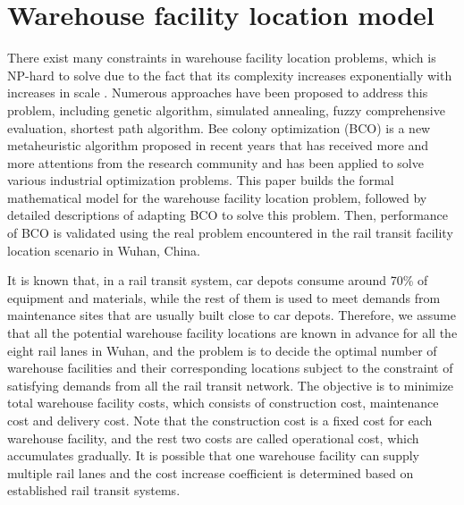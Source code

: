 \section{Warehouse facility location model}
There exist many constraints in warehouse facility location problems\citep{c1, c2}, which is NP-hard to solve due to the fact that its complexity increases exponentially with increases in scale \citep{c3}.
Numerous approaches have been proposed to address this problem, including genetic algorithm, simulated annealing, fuzzy comprehensive evaluation, shortest path algorithm.
Bee colony optimization (BCO) \citep{c4} is a new metaheuristic algorithm proposed in recent years that has received more and more attentions from the research community and has been applied to solve various industrial optimization problems.
This paper builds the formal mathematical model for the warehouse facility location problem, followed by detailed descriptions of adapting BCO to solve this problem.
Then, performance of BCO is validated using the real problem encountered in the rail transit facility location scenario in Wuhan, China.

It is known that, in a rail transit system, car depots consume around 70\% of equipment and materials, while the rest of them is used to meet demands from maintenance sites that are usually built close to car depots.
Therefore, we assume that all the potential warehouse facility locations are known in advance for all the eight rail lanes in Wuhan, and the problem is to decide the optimal number of warehouse facilities and their corresponding locations subject to the constraint of satisfying demands from all the rail transit network.
The objective is to minimize total warehouse facility costs, which consists of construction cost, maintenance cost and delivery cost.
Note that the construction cost is a fixed cost for each warehouse facility, and the rest two costs are called operational cost, which accumulates gradually.
It is possible that one warehouse facility can supply multiple rail lanes and the cost increase coefficient is determined based on established rail transit systems.

